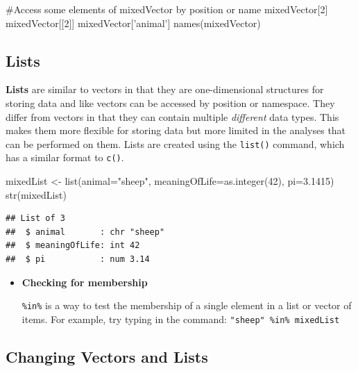 \documentclass[a4paper]{book}
\newenvironment{Shaded}{}{}
\newcommand{\KeywordTok}[1]{\textcolor[rgb]{0.00,0.00,1.00}{{#1}}}
\newcommand{\DataTypeTok}[1]{{#1}}
\newcommand{\DecValTok}[1]{{#1}}
\newcommand{\FloatTok}[1]{{#1}}
\newcommand{\StringTok}[1]{\textcolor[rgb]{0.00,0.50,0.50}{{#1}}}
\newcommand{\CommentTok}[1]{\textcolor[rgb]{0.00,0.50,0.00}{{#1}}}
\newcommand{\NormalTok}[1]{{#1}}
\newlength{\leftbarwidth}
\newlength{\leftbarsep}
\newcommand*{\leftbarcolorcmd}{\color{darkgray}}%
\renewenvironment{leftbar}{%
    \def\FrameCommand{{\leftbarcolorcmd{\vrule width \leftbarwidth\relax\hspace {\leftbarsep}}}}%
    \MakeFramed {\advance \hsize -\width \FrameRestore }%
}{%
    \endMakeFramed
}
\renewenvironment{Shaded}
{\vspace{0em}\begin{leftbar}\begin{snugshade}}
{\end{snugshade}\end{leftbar}\vspace{0pt}}
\newenvironment{rmdblock}[1]
  {\vspace{1.5em}\begin{shaded*}
  \begin{itemize}
  \renewcommand{\labelitemi}{
    \raisebox{-.7\height}[0pt][0pt]{
      {\setkeys{Gin}{width=3em,keepaspectratio}\texttt{[image: images/\#1]}}
    }
  }
  \item
  }
  {
  \end{itemize}
  \end{shaded*}
  }
\newenvironment{rmdtip}
  {\begin{rmdblock}{tip}}
  {\end{rmdblock}}
\begin{document}
\begin{Shaded}
\begin{Highlighting}[]
\CommentTok{#Access some elements of mixedVector by position or name}
\NormalTok{mixedVector[}\DecValTok{2}\NormalTok{]}
\NormalTok{mixedVector[[}\DecValTok{2}\NormalTok{]]}
\NormalTok{mixedVector[}\StringTok{'animal'}\NormalTok{]}
\KeywordTok{names}\NormalTok{(mixedVector)}
\end{Highlighting}
\end{Shaded}

\subsection{Lists}\label{lists}

\textbf{Lists} are similar to vectors in that they are one-dimensional
structures for storing data and like vectors can be accessed by position
or namespace. They differ from vectors in that they can contain multiple
\emph{different} data types. This makes them more flexible for storing
data but more limited in the analyses that can be performed on them.
Lists are created using the \texttt{list()} command, which has a similar
format to \texttt{c()}.

\begin{Shaded}
\begin{Highlighting}[]
\NormalTok{mixedList <-}\StringTok{ }\KeywordTok{list}\NormalTok{(}\DataTypeTok{animal=}\StringTok{"sheep"}\NormalTok{, }\DataTypeTok{meaningOfLife=}\KeywordTok{as.integer}\NormalTok{(}\DecValTok{42}\NormalTok{), }\DataTypeTok{pi=}\FloatTok{3.1415}\NormalTok{)}
\KeywordTok{str}\NormalTok{(mixedList)}
\end{Highlighting}
\end{Shaded}

\begin{verbatim}
## List of 3
##  $ animal       : chr "sheep"
##  $ meaningOfLife: int 42
##  $ pi           : num 3.14
\end{verbatim}

\begin{rmdtip}
\textbf{Checking for membership}

\texttt{\%in\%} is a way to test the membership of a single element in a
list or vector of items. For example, try typing in the command:
\texttt{"sheep"\ \%in\%\ mixedList}
\end{rmdtip}

\subsection{Changing Vectors and
Lists}\label{changing-vectors-and-lists}
\end{document}
